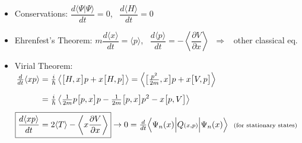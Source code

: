\documentclass[12pt]{article}
\begin{document}
\begin{itemize}
    \item Conservations: \hspace{18pt} \( \dfrac{d \langle \Psi | \Psi \rangle}{dt} = 0 \), \ 
    \( \dfrac{d \langle H \rangle}{dt} = 0 \)

    \item Ehrenfest's Theorem: \hspace{18pt} 
    \( m \dfrac{d \langle x \rangle}{dt} = \langle p \rangle \), \ 
    \( \dfrac{d \langle p \rangle}{dt} = - \left\langle \dfrac{\partial V}{\partial x} \right\rangle \)
    \( \ \Rightarrow \) \ other classical eq.

    \item Virial Theorem: \hspace{18pt} \( \displaystyle 
    \begin{aligned}[t]
        \tfrac{d}{dt} \langle xp \rangle
            & = \tfrac{i}{\hbar} \left\langle \big[ H,x \big] p + x \big[ H,p \big] \right\rangle 
            = \left\langle \big[ \tfrac{p^2}{2m} , x \big] p + x \big[ V, p \big] \right\rangle 
            \\[5pt]
        & = \tfrac{i}{\hbar} 
            \left\langle 
            \tfrac{1}{2m} p \big[ p, x \big] p 
            - \tfrac{1}{2m} \big[ p, x \big] p^2 
            - x \big[ p, V \big] 
            \right\rangle 
            \\[5pt]
        \Aboxed{ \frac{d \langle xp \rangle}{dt}
            &= 2 \langle T \rangle - 
            \left\langle x \frac{\partial V}{\partial x} \right\rangle }
            \rightarrow 0 = \tfrac{d}{dt} \Big\langle \Psi_n(x) \Big| Q{\scriptstyle(x,p)} \Big| \Psi_n(x) \Big\rangle 
            \ \ \text{\scriptsize (for stationary states) }
    \end{aligned} \)


\end{itemize}
\end{document}
